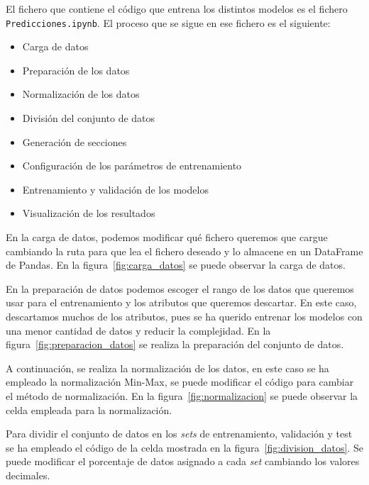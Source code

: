\par

El fichero que contiene el código que entrena los distintos modelos es el fichero \texttt{Predicciones.ipynb}. El proceso que se sigue en ese fichero es el siguiente:

\begin{itemize}
    \item Carga de datos
    \item Preparación de los datos
    \item Normalización de los datos
    \item División del conjunto de datos
    \item Generación de secciones
    \item Configuración de los parámetros de entrenamiento
    \item Entrenamiento y validación de los modelos
    \item Visualización de los resultados
\end{itemize}

En la carga de datos, podemos modificar qué fichero queremos que cargue cambiando la ruta para que lea el fichero deseado y lo almacene en un DataFrame de Pandas. En la figura~\ref{fig:carga_datos} se puede observar la carga de datos.


En la preparación de datos podemos escoger el rango de los datos que queremos usar para el entrenamiento y los atributos que queremos descartar. En este caso, descartamos muchos de los atributos, pues se ha querido entrenar los modelos con una menor cantidad de datos y reducir la complejidad. En la figura~\ref{fig:preparacion_datos} se realiza la preparación del conjunto de datos.


A continuación, se realiza la normalización de los datos, en este caso se ha empleado la normalización Min-Max, se puede modificar el código para cambiar el método de normalización. En la figura~\ref{fig:normalizacion} se puede observar la celda empleada para la normalización.


Para dividir el conjunto de datos en los \textit{sets} de entrenamiento, validación y test se ha empleado el código de la celda mostrada en la figura~\ref{fig:division_datos}. Se puede modificar el porcentaje de datos asignado a cada \textit{set} cambiando los valores decimales.

